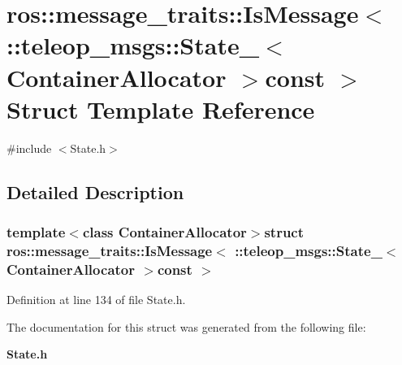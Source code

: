 \section{ros::message\_\-traits::IsMessage$<$ ::teleop\_\-msgs::State\_\-$<$ ContainerAllocator $>$const $>$ Struct Template Reference}
\label{structros_1_1message__traits_1_1IsMessage_3_01_1_1teleop__msgs_1_1State___3_01ContainerAllocator_01_4const_01_01_4}


{\ttfamily \#include $<$State.h$>$}



\subsection{Detailed Description}
\subsubsection*{template$<$class ContainerAllocator$>$struct ros::message\_\-traits::IsMessage$<$ ::teleop\_\-msgs::State\_\-$<$ ContainerAllocator $>$const  $>$}



Definition at line 134 of file State.h.



The documentation for this struct was generated from the following file:\begin{DoxyCompactItemize}
\item 
{\bf State.h}\end{DoxyCompactItemize}
